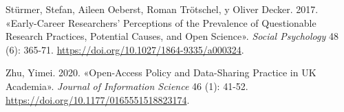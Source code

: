 \documentclass[
  letterpaper,
  DIV=11,
  numbers=noendperiod]{scrreprt}
\newlength{\cslhangindent}
\newlength{\cslentryspacingunit} %
\newenvironment{CSLReferences}[2] %
 {%
  \setlength{\parindent}{0pt}
  \ifodd #1
  \let\oldpar\par
  \def\par{\hangindent=\cslhangindent\oldpar}
  \fi
  \setlength{\parskip}{#2\cslentryspacingunit}
 }%
 {}
\begin{document}
\begin{CSLReferences}{1}{0}
\leavevmode{}%
Stürmer, Stefan, Aileen Oeberst, Roman Trötschel, y Oliver Decker. 2017.
{«Early-{Career Researchers}' {Perceptions} of the {Prevalence} of
{Questionable Research Practices}, {Potential Causes}, and {Open
Science}»}. \emph{Social Psychology} 48 (6): 365-71.
\url{https://doi.org/10.1027/1864-9335/a000324}.

\leavevmode{}%
Zhu, Yimei. 2020. {«Open-Access Policy and Data-Sharing Practice in {UK}
Academia»}. \emph{Journal of Information Science} 46 (1): 41-52.
\url{https://doi.org/10.1177/0165551518823174}.

\end{CSLReferences}
\end{document}
